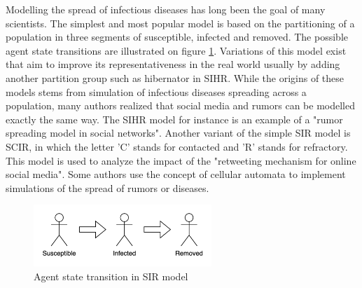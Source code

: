 Modelling the spread of infectious diseases has long been the goal of many scientists\cite{liu2016}.
The simplest and most popular model is based on the partitioning of a population in three segments of susceptible, infected and removed\cite{weiss2013sir}.
The possible agent state transitions are illustrated on figure \ref{fig:sir.drawio.png}.
Variations of this model exist that aim to improve its representativeness in the real world usually by adding another partition group such as hibernator in SIHR\cite{zhao2012sihr}.
While the origins of these models stems from simulation of infectious diseases spreading across a population, many authors realized that social media and rumors can be modelled exactly the same way.
The SIHR model for instance is an example of a "rumor spreading model in social networks"\cite{zhao2012sihr}.
Another variant of the simple SIR model is SCIR, in which the letter 'C' stands for contacted and 'R' stands for refractory.
This model is used to analyze the impact of the "retweeting mechanism for online social media"\cite{xiong2012scir}.
Some authors use the concept of cellular automata to implement simulations of the spread of rumors or diseases\cite{silva2020}.

\begin{figure}[h]
    \centering
    \includegraphics[width=0.6\textwidth]{images/chapter2/sir.drawio.png}
    \caption{Agent state transition in SIR model}\label{fig:sir.drawio.png}
\end{figure}

